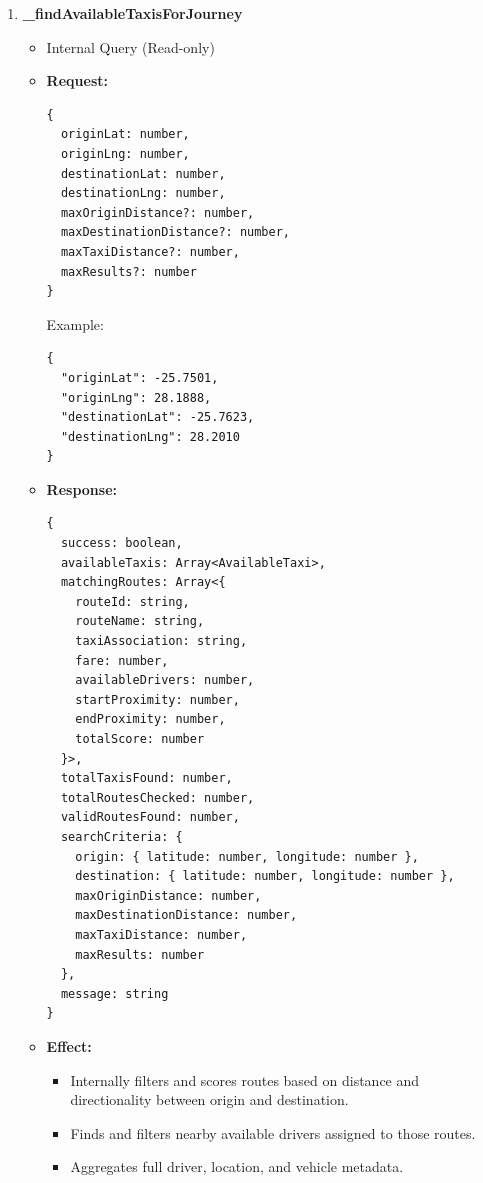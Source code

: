 \documentclass[a4paper,12pt]{article}
\begin{document}
\begin{enumerate}
  \item \textbf{\_findAvailableTaxisForJourney}
  \begin{itemize}
    \item Internal Query (Read-only)
    \item \textbf{Request:}
    \begin{verbatim}
{
  originLat: number,
  originLng: number,
  destinationLat: number,
  destinationLng: number,
  maxOriginDistance?: number,
  maxDestinationDistance?: number,
  maxTaxiDistance?: number,
  maxResults?: number
}
    \end{verbatim}
    Example:
    \begin{verbatim}
{
  "originLat": -25.7501,
  "originLng": 28.1888,
  "destinationLat": -25.7623,
  "destinationLng": 28.2010
}
    \end{verbatim}
    \item \textbf{Response:}
    \begin{verbatim}
{
  success: boolean,
  availableTaxis: Array<AvailableTaxi>,
  matchingRoutes: Array<{
    routeId: string,
    routeName: string,
    taxiAssociation: string,
    fare: number,
    availableDrivers: number,
    startProximity: number,
    endProximity: number,
    totalScore: number
  }>,
  totalTaxisFound: number,
  totalRoutesChecked: number,
  validRoutesFound: number,
  searchCriteria: {
    origin: { latitude: number, longitude: number },
    destination: { latitude: number, longitude: number },
    maxOriginDistance: number,
    maxDestinationDistance: number,
    maxTaxiDistance: number,
    maxResults: number
  },
  message: string
}
    \end{verbatim}
    \item \textbf{Effect:}
    \begin{itemize}
      \item Internally filters and scores routes based on distance and directionality between origin and destination.
      \item Finds and filters nearby available drivers assigned to those routes.
      \item Aggregates full driver, location, and vehicle metadata.
    \end{itemize}
  \end{itemize}


\end{enumerate}
\end{document}
